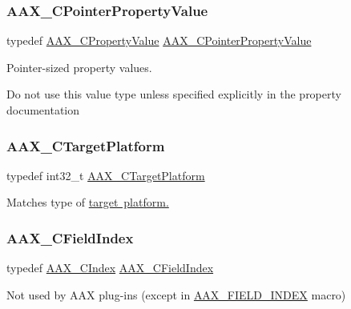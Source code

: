 \subsubsection{\texorpdfstring{AAX\_CPointerPropertyValue}{AAX\_CPointerPropertyValue}}
{\footnotesize\ttfamily typedef \mbox{\hyperlink{a00392_ab247c0d8686c14e05cbb567ef276f249}{A\+A\+X\+\_\+\+C\+Property\+Value}} \mbox{\hyperlink{a00392_a7abe263a7521e988ed4ee4ac691ed5f9}{A\+A\+X\+\_\+\+C\+Pointer\+Property\+Value}}}



Pointer-\/sized property values. 

Do not use this value type unless specified explicitly in the property documentation \mbox{\label{a00392_a8f2cefa455217fa9f3ce190fe5fd8033}} 
\subsubsection{\texorpdfstring{AAX\_CTargetPlatform}{AAX\_CTargetPlatform}}
{\footnotesize\ttfamily typedef int32\+\_\+t \mbox{\hyperlink{a00392_a8f2cefa455217fa9f3ce190fe5fd8033}{A\+A\+X\+\_\+\+C\+Target\+Platform}}}



Matches type of \mbox{\hyperlink{a00491_a19e8cc27f59bb9bb4039b00fadb3cb83}{target platform.}}

\mbox{\label{a00392_ae807f8986143820cfb5d6da32165c9c7}} 
\subsubsection{\texorpdfstring{AAX\_CFieldIndex}{AAX\_CFieldIndex}}
{\footnotesize\ttfamily typedef \mbox{\hyperlink{a00392_a24ac375fa55ccadbc3126e6d81146c28}{A\+A\+X\+\_\+\+C\+Index}} \mbox{\hyperlink{a00392_ae807f8986143820cfb5d6da32165c9c7}{A\+A\+X\+\_\+\+C\+Field\+Index}}}



Not used by A\+AX plug-\/ins (except in \mbox{\hyperlink{a00392_acf807247ecd6e5899dc9dc31644e9a1d}{A\+A\+X\+\_\+\+F\+I\+E\+L\+D\+\_\+\+I\+N\+D\+EX}} macro) 

\mbox{\label{a00392_a7e697acf597bd7024de6bb13b9845ce7}} 
